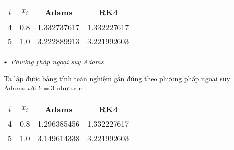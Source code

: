 \begin{longtable}{|c|c|c|c|}\hline
$i$&$x_i$&Adams&RK4\\ \hline
\endhead
4 &0.8 &1.332737617 &1.332227617\\ \hline
5 &1.0 &3.222889913 &3.221992603\\ \hline
\end{longtable}

$\star$~\textit{Phương pháp ngoại suy Adams}\par
Ta lập được bảng tính toán nghiệm gần đúng theo phương pháp ngoại suy Adams với $k=3$ như sau:

\begin{longtable}{|c|c|c|c|}\hline
$i$&$x_i$&Adams&RK4\\ \hline
\endhead
4 &0.8 &1.296385456 &1.332227617 \\ \hline
5 &1.0 &3.149614338 &3.221992603 \\ \hline\end{longtable}
